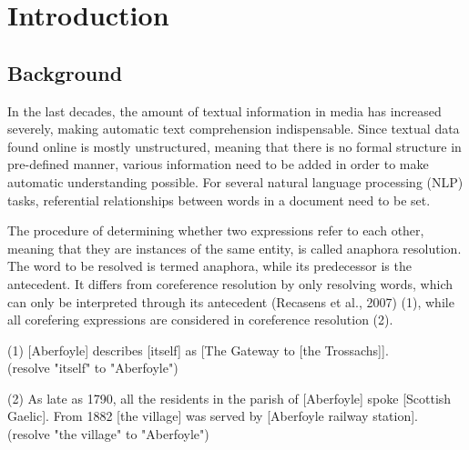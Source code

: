 \chapter{Introduction}
\label{sec:Introduction}

\section{Background}

In the last decades, the amount of textual information in media has increased severely, making automatic text comprehension indispensable. Since textual data found online is mostly unstructured, meaning that there is no formal structure in pre-defined manner, various information need to be added in order to make automatic understanding possible. For several natural language processing (NLP) tasks, referential relationships between words  in a document need to be set. 

The procedure of determining whether two expressions  refer to each other, meaning that they are instances of the same entity, is called anaphora resolution. The word to be resolved is termed anaphora, while its predecessor is the antecedent. It differs from coreference resolution by only resolving words, which can only be interpreted through its antecedent (Recasens et al., 2007) (1), while all corefering expressions are considered in coreference resolution (2).

(1) [Aberfoyle] describes [itself] as [The Gateway to [the Trossachs]]. \\
(resolve "itself" to "Aberfoyle")

(2) As late as 1790, all the residents in the parish of [Aberfoyle] spoke [Scottish Gaelic]. From 1882 [the village] was served by [Aberfoyle railway station].\\
(resolve "the village"  to "Aberfoyle")

